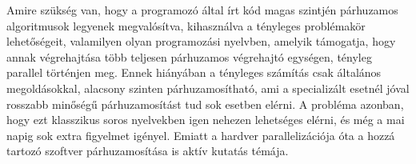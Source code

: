 Amire szükség van, hogy a programozó által írt kód magas szintjén párhuzamos algoritmusok legyenek megvalósítva, kihasználva a tényleges problémakör lehetőségeit, valamilyen olyan programozási nyelvben, amelyik támogatja, hogy annak végrehajtása több teljesen párhuzamos végrehajtó egységen, tényleg parallel történjen meg.
Ennek hiányában a tényleges számítás csak általános megoldásokkal, alacsony szinten párhuzamosítható, ami a specializált esetnél jóval rosszabb minőségű párhuzamosítást tud sok esetben elérni.
A probléma azonban, hogy ezt klasszikus soros nyelvekben igen nehezen lehetséges elérni, és még a mai napig sok extra figyelmet igényel.
Emiatt a hardver parallelizációja óta a hozzá tartozó szoftver párhuzamosítása is aktív kutatás témája.

%
%
%
